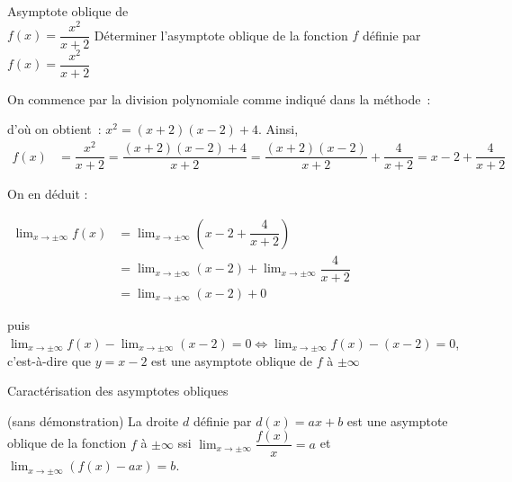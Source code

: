 \documentclass[a4paper,12pt]{article}
\begin{document}
\begin{exemple}
	Asymptote oblique de\\
	\medskip
	$f(x)=\dfrac{x^2}{x+2}$
	\tcblower
Déterminer l'asymptote oblique de la fonction $f$ définie par $f(x) = \dfrac{x^2}{x + 2}$
\smallskip

On commence par la division polynomiale comme indiqué dans la méthode~:
\begin{center}
\end{center}
d'où on obtient~: $x^2 = (x + 2)(x - 2) + 4$.
Ainsi, 
\begin{align*}
f(x) &= \dfrac{x^2}{x + 2} = \dfrac{(x + 2)(x - 2) + 4}{x + 2} = \dfrac{(x + 2)(x - 2)}{x + 2} + \dfrac{4}{x + 2}= x - 2 + \dfrac{4}{x + 2}
\end{align*}

On en déduit :

$
\begin{aligned}
	\displaystyle\lim_{x \to \pm\infty} f(x) &= \displaystyle\lim_{x \to \pm\infty} \left( x - 2 + \dfrac{4}{x + 2} \right)\\
&= \displaystyle\lim_{x \to \pm\infty} (x - 2) + \displaystyle\lim_{x \to \pm\infty} \dfrac{4}{x + 2}\\
&= \displaystyle\lim_{x \to \pm\infty} (x - 2) + 0
\end{aligned}
$
\medskip

puis $\displaystyle\lim_{x \to \pm\infty} f(x) - \displaystyle\lim_{x \to \pm\infty} (x-2) = 0 \Leftrightarrow \displaystyle\lim_{x \to \pm\infty} f(x) - (x-2) = 0$, c'est-à-dire que $y = x-2$ est une asymptote oblique de $f$ à $\pm\infty$
\end{exemple}

\begin{thm}[label=thm:obli]
	Caractérisation des asymptotes obliques

	(sans démonstration)
	\tcblower
La droite $d$ définie par $d(x) = ax + b$ est une asymptote oblique de la fonction $f$ à $\pm\infty$ ssi $\displaystyle\lim_{x \to \pm\infty} \dfrac{f(x)}{x} = a$ et $\displaystyle\lim_{x \to \pm\infty} (f(x) - ax) = b$.
\end{thm}
\end{document}
